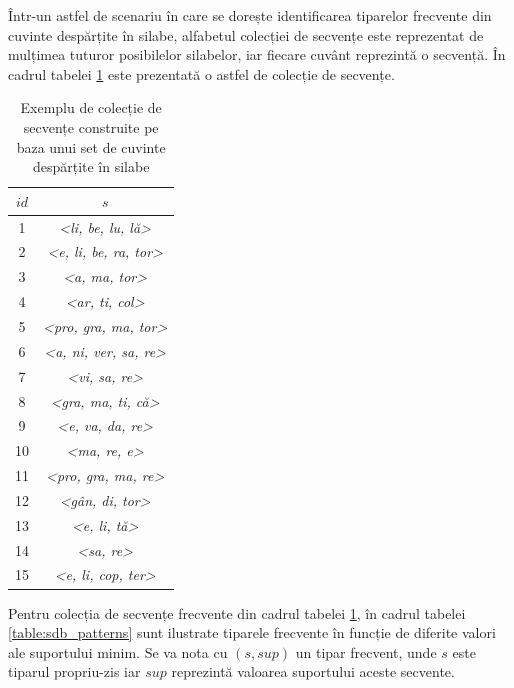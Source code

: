 \begin{ex}
Într-un astfel de scenariu în care se dorește identificarea tiparelor frecvente din cuvinte despărțite în silabe, alfabetul colecției de secvențe este reprezentat de mulțimea tuturor posibilelor silabelor, iar fiecare cuvânt reprezintă o secvență. În cadrul tabelei \ref{table:sdb_words} este prezentată o astfel de colecție de secvențe.
\end{ex}

\begin{table}[h]
\centering    
\begin{tabular}{|c|c|}    
\hline      
$id$ & $s$ \\
\hline
1 & \textit{<li, be, lu, lă>} \\
2 & \textit{<e, li, be, ra, tor>} \\
3 & \textit{<a, ma, tor>}\\
4 & \textit{<ar, ti, col>} \\
5 & \textit{<pro, gra, ma, tor>} \\
6 & \textit{<a, ni, ver, sa, re>} \\
7 & \textit{<vi, sa, re>} \\
8 & \textit{<gra, ma, ti, că>} \\
9 & \textit{<e, va, da, re>} \\
10 & \textit{<ma, re, e>} \\
11 & \textit{<pro, gra, ma, re>} \\
12 & \textit{<gân, di, tor>} \\
13 & \textit{<e, li, tă>} \\
14 & \textit{<sa, re>} \\
15 & \textit{<e, li, cop, ter>} \\
\hline                              
\end{tabular}
\caption{Exemplu de colecție de secvențe construite pe baza unui set de cuvinte despărțite în silabe}
\label{table:sdb_words}               
\end{table}

Pentru colecția de secvențe frecvente din cadrul tabelei \ref{table:sdb_words}, în cadrul tabelei \ref{table:sdb_patterns} sunt ilustrate tiparele frecvente în funcție de diferite valori ale suportului minim. Se va nota cu $(s,sup)$ un tipar frecvent, unde $s$ este tiparul propriu-zis iar $sup$ reprezintă valoarea suportului aceste secvente.

